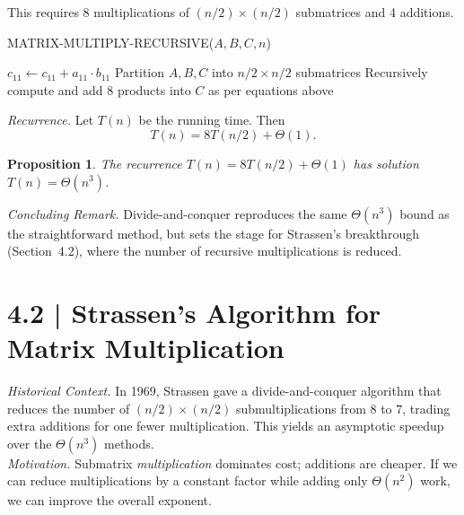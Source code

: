 \documentclass[12pt]{article}
\newcommand{\microhead}[1]{\vspace{0.45em}\noindent\textit{#1}}
\newtheorem{proposition}[theorem]{Proposition}
\theoremstyle{definition}
\begin{document}
This requires 8 multiplications of $(n/2)\times(n/2)$ submatrices and 4 additions.

\begin{algorithm}
\caption{MATRIX-MULTIPLY-RECURSIVE($A,B,C,n$)}\label{alg:matrix-multiply-rec}
\begin{algorithmic}[1]
  \State $c_{11} \gets c_{11} + a_{11} \cdot b_{11}$ 
  \State \Return
\EndIf
\State Partition $A,B,C$ into $n/2 \times n/2$ submatrices
\State Recursively compute and add 8 products into $C$ as per equations above
\end{algorithmic}
\end{algorithm}

\microhead{Recurrence.} Let $T(n)$ be the running time. Then
\[
T(n) = 8T(n/2) + \Theta(1).
\]

\begin{proposition}
The recurrence $T(n) = 8T(n/2) + \Theta(1)$ has solution $T(n) = \Theta(n^3)$.
\end{proposition}

\microhead{Concluding Remark.} Divide-and-conquer reproduces the same $\Theta(n^3)$ bound as the straightforward method, but sets the stage for Strassen’s breakthrough (Section~4.2), where the number of recursive multiplications is reduced.

\newpage

\dotfill
\section*{4.2 | Strassen's Algorithm for Matrix Multiplication}
\dotfill

\microhead{Historical Context.} In 1969, Strassen gave a divide-and-conquer algorithm that reduces the number of $(n/2)\times(n/2)$ submultiplications from $8$ to $7$, trading extra additions for one fewer multiplication. This yields an asymptotic speedup over the $\Theta(n^3)$ methods. \\

\microhead{Motivation.} Submatrix \emph{multiplication} dominates cost; additions are cheaper. If we can reduce multiplications by a constant factor while adding only $\Theta(n^2)$ work, we can improve the overall exponent. \\
\end{document}
